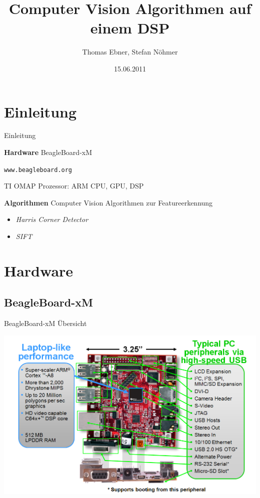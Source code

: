 \documentclass{beamer}
\title{Computer Vision Algorithmen auf einem DSP}
\author{Thomas Ebner, Stefan Nöhmer}
\date{15.06.2011}
\begin{document}
	\frame{\titlepage}
	
	
	\section{Einleitung}
	\begin{frame}{Einleitung}
	  
	  \begin{block}{\textbf{Hardware}}
	    BeagleBoard-xM
	    
      \texttt{www.beagleboard.org}
      
      TI OMAP Prozessor: ARM CPU, GPU, DSP
    \end{block}
    
    \begin{block}{\textbf{Algorithmen}}
      Computer Vision Algorithmen zur Featureerkennung
      
      \begin{itemize}
        \item \emph{Harris Corner Detector}
        \item \emph{SIFT}
      \end{itemize}
    \end{block}

  \end{frame}
	
	
	\section{Hardware}
		
		\subsection{BeagleBoard-xM}
		\begin{frame}{BeagleBoard-xM Übersicht}
			\begin{center}
        \includegraphics[height=0.7\paperheight]{./img/beagleboard-xm.png}
      \end{center}
		\end{frame}
		
\end{document}
